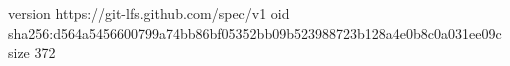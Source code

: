 version https://git-lfs.github.com/spec/v1
oid sha256:d564a5456600799a74bb86bf05352bb09b523988723b128a4e0b8c0a031ee09c
size 372

